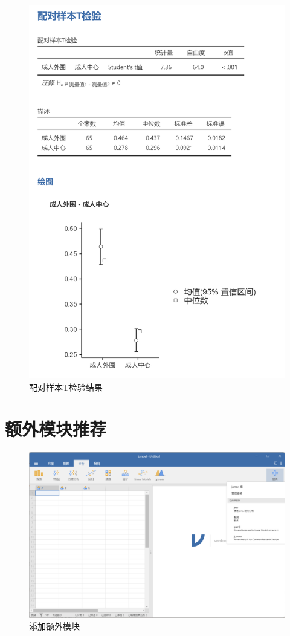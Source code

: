 \documentclass[]{ctexbook}
\theoremstyle{definition}
\theoremstyle{definition}
\theoremstyle{definition}
\theoremstyle{definition}
\theoremstyle{remark}
\begin{document}
\begin{figure}

{\centering \includegraphics[width=0.8\linewidth]{img/jamovi/ttest-results} 

}

\caption{配对样本T检验结果}\label{fig:jamovi-ttest-results}
\end{figure}

\section{额外模块推荐}\label{ux989dux5916ux6a21ux5757ux63a8ux8350}

\begin{figure}

{\centering \includegraphics[width=1\linewidth]{img/jamovi/modules} 

}

\caption{添加额外模块}\label{fig:jamovi-modules}
\end{figure}
\end{document}
